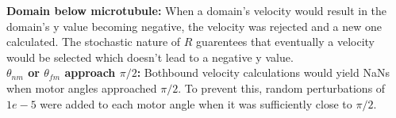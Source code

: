 \documentclass[9pt,twoside,lineno]{pnas-new}
\begin{document}
\textbf{Domain below microtubule:} When a domain's velocity would result in the domain's y value becoming negative, the velocity was rejected and a new one calculated. The stochastic nature of $R$ guarentees that eventually a velocity would be selected which doesn't lead to a negative y value.\\

\textbf{$\theta_{nm}$ or $\theta_{fm}$ approach $\pi/2$:} Bothbound velocity calculations would yield NaNs when motor angles approached $\pi/2$. To prevent this, random perturbations of $1e-5$ were added to each motor angle when it was sufficiently close to $\pi/2$.





\FloatBarrier






\end{document}
